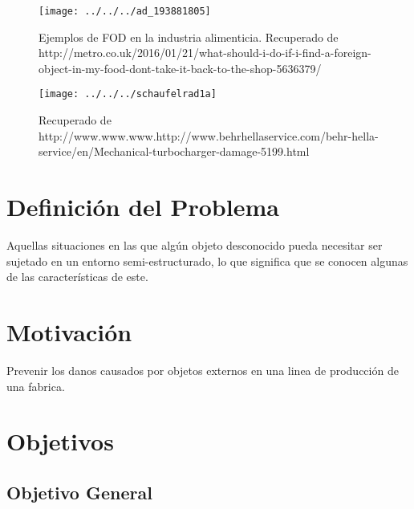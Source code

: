 \begin{figure}
	\centering
	\texttt{[image: ../../../ad\_193881805]}
	\caption{Ejemplos de FOD en la industria alimenticia.
		Recuperado de http://metro.co.uk/2016/01/21/what-should-i-do-if-i-find-a-foreign-object-in-my-food-dont-take-it-back-to-the-shop-5636379/}
	\label{fig:ad193881805}
\end{figure}
\begin{figure}
	\centering
	\texttt{[image: ../../../schaufelrad1a]}
	\caption{ Recuperado de http://www.www.www.http://www.behrhellaservice.com/behr-hella-service/en/Mechanical-turbocharger-damage-5199.html}
	\label{fig:schaufelrad1a}
\end{figure}

 
\section{Definición del Problema}

 Aquellas situaciones en las que algún objeto desconocido pueda necesitar ser  sujetado en un entorno semi-estructurado, lo que significa que se conocen algunas de las características de este.

\section{Motivación}
Prevenir los danos causados por objetos externos en una linea de producción de una fabrica.


\section{Objetivos}

\subsection{Objetivo General}

